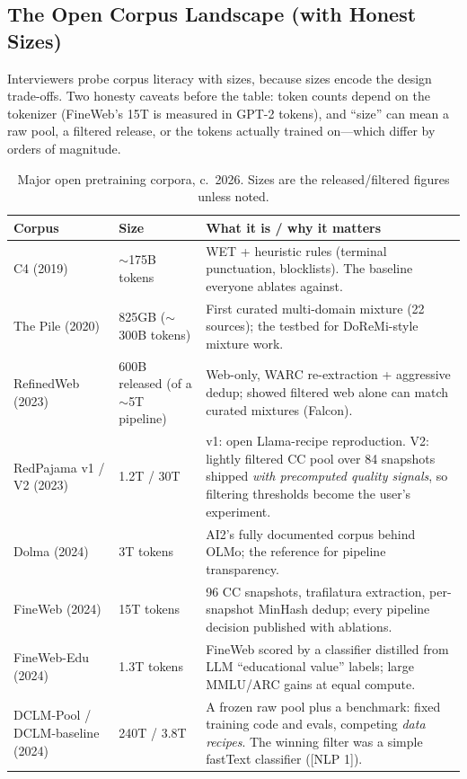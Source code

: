 \subsection{The Open Corpus Landscape (with Honest Sizes)}

Interviewers probe corpus literacy with sizes, because sizes encode the design trade-offs. Two honesty caveats before the table: token counts depend on the tokenizer (FineWeb's 15T is measured in GPT-2 tokens), and ``size'' can mean a raw pool, a filtered release, or the tokens actually trained on---which differ by orders of magnitude.

\begin{table}[H]
\centering
\small
\caption{Major open pretraining corpora, c.~2026. Sizes are the released/filtered figures unless noted.}
\label{tab:pretrain_corpora}
\begin{tabularx}{\textwidth}{llX}
\toprule
\textbf{Corpus} & \textbf{Size} & \textbf{What it is / why it matters} \\
\midrule
C4 (2019) & $\sim$175B tokens & WET + heuristic rules (terminal punctuation, blocklists). The baseline everyone ablates against. \\
The Pile (2020) & 825GB ($\sim$300B tokens) & First curated multi-domain mixture (22 sources); the testbed for DoReMi-style mixture work. \\
RefinedWeb (2023) & 600B released (of a $\sim$5T pipeline) & Web-only, WARC re-extraction + aggressive dedup; showed filtered web alone can match curated mixtures (Falcon). \\
RedPajama v1 / V2 (2023) & 1.2T / 30T & v1: open Llama-recipe reproduction. V2: lightly filtered CC pool over 84 snapshots shipped \textit{with precomputed quality signals}, so filtering thresholds become the user's experiment. \\
Dolma (2024) & 3T tokens & AI2's fully documented corpus behind OLMo; the reference for pipeline transparency. \\
FineWeb (2024) & 15T tokens & 96 CC snapshots, trafilatura extraction, per-snapshot MinHash dedup; every pipeline decision published with ablations. \\
FineWeb-Edu (2024) & 1.3T tokens & FineWeb scored by a classifier distilled from LLM ``educational value'' labels; large MMLU/ARC gains at equal compute. \\
DCLM-Pool / DCLM-baseline (2024) & 240T / 3.8T & A frozen raw pool plus a benchmark: fixed training code and evals, competing \textit{data recipes}. The winning filter was a simple fastText classifier ([NLP 1]). \\

\end{tabularx}
\end{table}
